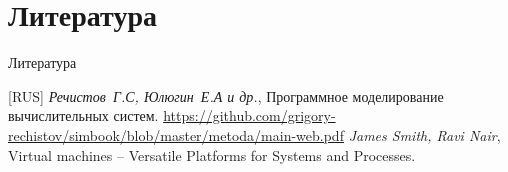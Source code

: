 \section{Литература}

\begin{frame}[allowframebreaks]{Литература}
\begin{thebibliography}{99}
  \bibitem{} [RUS] \textit{Речистов~Г.С, Юлюгин~Е.А и др.},
    Программное моделирование вычислительных систем.
    \url{https://github.com/grigory-rechistov/simbook/blob/master/metoda/main-web.pdf}
  \bibitem{} \textit{James Smith, Ravi Nair}, Virtual machines -- Versatile
    Platforms for Systems and Processes.
\end{thebibliography}
\end{frame}

\finalslide


